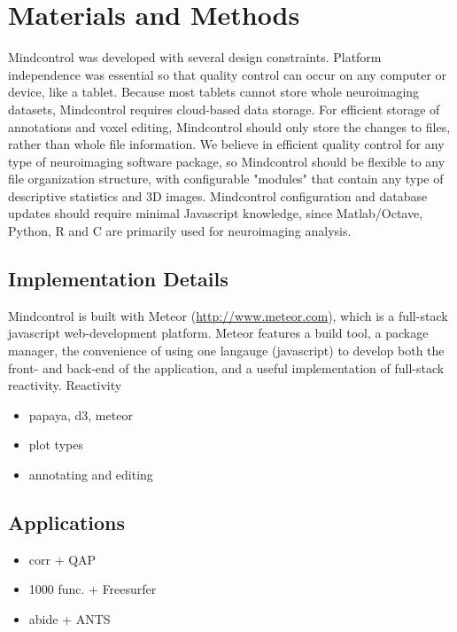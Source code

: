 \section{Materials and Methods}

Mindcontrol was developed with several design constraints. Platform independence was essential so that quality control can occur on any computer or device, like a tablet. Because most tablets cannot store whole neuroimaging datasets, Mindcontrol requires cloud-based data storage. For efficient storage of annotations and voxel editing, Mindcontrol should only store the changes to files, rather than whole file information. We believe in efficient quality control for any type of neuroimaging software package, so Mindcontrol should be flexible to any file organization structure, with configurable "modules" that contain any type of descriptive statistics and 3D images. Mindcontrol configuration and database updates should require minimal Javascript knowledge, since Matlab/Octave, Python, R and C are primarily used for neuroimaging analysis.  


\subsection{Implementation Details}

Mindcontrol is built with Meteor (\href{http://www.meteor.com}{http://www.meteor.com}), which is a full-stack javascript web-development platform. Meteor features a build tool, a package manager, the convenience of using one langauge (javascript) to develop both the front- and back-end of the application, and a useful implementation of full-stack reactivity. Reactivity 

\begin{itemize}
\item papaya, d3, meteor
\item plot types
\item annotating and editing
\end{itemize}

\subsection{Applications}

\begin{itemize}
\item corr + QAP
\item 1000 func. + Freesurfer
\item abide + ANTS
\end{itemize}

